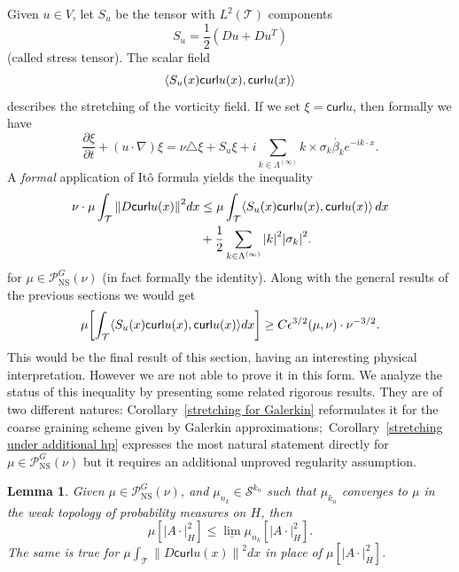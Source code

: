 \documentclass[11pt]{preprint}
\newtheorem{lemma}[theorem]{Lemma}
\begin{document}
Given $u\in V$, let $S_{u}$ be the tensor with $L^{2}\left(  \mathcal{T}%
\right)  $ components
\[
S_{u}=\frac{1}{2}\left(  Du+Du^{T}\right)
\]
(called stress tensor). The scalar field
\[
\scal{S_{u}\left( x\right) \mathsf{curl}u\left( x\right) , \mathsf{curl}%
u\left( x\right)}%
\]
describes the stretching of the vorticity field. If we set $\xi=\mathsf{curl}%
u$, then formally we have
\[
\frac{\partial\xi}{\partial t}+\left(  u\cdot\nabla\right)  \xi=\nu
\triangle\xi+S_{u}\xi+i\sum_{k\in\Lambda^{(\infty)}}k\times\sigma_{k}%
\overset{\cdot}{\beta}_{k}e^{-ik\cdot x}.
\]
A \textit{formal} application of It\^{o} formula yields the inequality
\begin{align*}
\nu\cdot\mu\int_{\mathcal{T}}\left\|  D\mathsf{curl}u\left(  x\right)
\right\|  ^{2}dx &  \leq\mu\int_{\mathcal{T}}\scal{S_{u}\left( x\right
) \mathsf{curl}u\left( x\right), \mathsf{curl}u\left( x\right)}\,dx\\
&  +\frac{1}{2}\sum_{k\in\Lambda^{(\infty)}}\left|  k\right|  ^{2}\left|
\sigma_{k}\right|  ^{2}.
\end{align*}
for $\mu\in\mathcal{P}_{{\mathrm{NS}}}^{G}\left(  \nu\right)  $ (in fact
formally the identity). Along with the general results of the previous
sections we would get
\begin{equation}
\mu\left[  \int_{\mathcal{T}}\scal{S_{u}\left( x\right) \mathsf{curl}%
u\left( x\right), \mathsf{curl}u\left( x\right)}dx\right]  \geq C\epsilon
^{3/2}\left(  \mu,\nu\right)  \cdot\nu^{-3/2}.\label{desiderata}%
\end{equation}
This would be the final result of this section, having an interesting physical
interpretation. However we are not able to prove it in this form. We analyze the status of this inequality by presenting some related rigorous results. They are
of two different natures: Corollary~\ref{stretching for Galerkin} reformulates
it for the coarse graining scheme given by Galerkin approximations;\ Corollary~\ref{stretching under additional hp} expresses the most natural statement
directly for $\mu\in\mathcal{P}_{{\mathrm{NS}}}^{G}\left(  \nu\right)  $ but
it requires an additional unproved regularity assumption.

\begin{lemma}
Given $\mu\in\mathcal{P}_{{\mathrm{NS}}}^{G}\left(  \nu\right)  $, and
$\mu_{n_{k}}\in\mathcal{S}^{k_{n}}$ such that $\mu_{k_{n}}$ converges to $\mu$
in the weak topology of probability measures on $H$, then
\[
\mu\left[  \left|  A\cdot\right|  _{H}^{2}\right]  \leq\underline{\lim}%
\mu_{n_{k}}\left[  \left|  A\cdot\right|  _{H}^{2}\right]  .
\]
The same is true for $\mu\int_{\mathcal{T}}\left\|  D\mathsf{curl}u\left(
x\right)  \right\|  ^{2}dx$ in place of $\mu\left[  \left|  A\cdot\right|
_{H}^{2}\right]  $.
\end{lemma}
\end{document}
